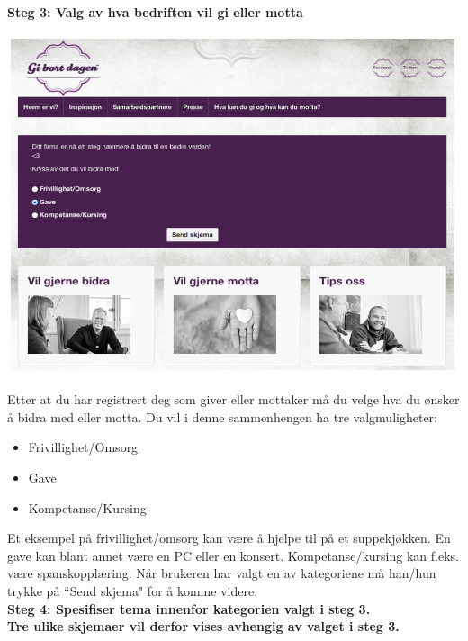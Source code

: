 \bf{Steg 3:} Valg av hva bedriften vil gi eller motta
\begin{center}
\includegraphics[clip=true, width=1 \textwidth,
trim=0cm 0cm 0cm 0cm]{valg1.png}
\label{fig:bidra}
\end{center}

Etter at du har registrert deg som giver eller mottaker må du velge hva du ønsker å bidra med eller motta. Du vil i denne sammenhengen ha tre valgmuligheter:\\

\begin{itemize}
    \item Frivillighet/Omsorg
    \item Gave
    \item Kompetanse/Kursing
\end{itemize}
Et eksempel på frivillighet/omsorg kan være å hjelpe til på et suppekjøkken. En gave kan blant annet være en PC eller en konsert. Kompetanse/kursing kan f.eks. være spanskopplæring. Når brukeren har valgt en av kategoriene må han/hun trykke på ``Send skjema" for å komme videre.\\

\bf{Steg 4:} Spesifiser tema innenfor kategorien valgt i steg 3.\\
Tre ulike skjemaer vil derfor vises avhengig av valget i steg 3.\\

